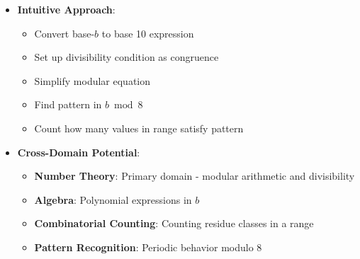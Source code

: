 \documentclass[11pt]{article}
\begin{document}
\begin{problemconfigbox}
\begin{itemize}[leftmargin=*]
    \item \textbf{Intuitive Approach}: 
    \begin{itemize}
        \item Convert base-$b$ to base 10 expression
        \item Set up divisibility condition as congruence
        \item Simplify modular equation
        \item Find pattern in $b \bmod 8$
        \item Count how many values in range satisfy pattern
    \end{itemize}
    
    \item \textbf{Cross-Domain Potential}: 
    \begin{itemize}
        \item \textbf{Number Theory}: Primary domain - modular arithmetic and divisibility
        \item \textbf{Algebra}: Polynomial expressions in $b$
        \item \textbf{Combinatorial Counting}: Counting residue classes in a range
        \item \textbf{Pattern Recognition}: Periodic behavior modulo 8
    \end{itemize}
\end{itemize}
\end{problemconfigbox}
\end{document}
